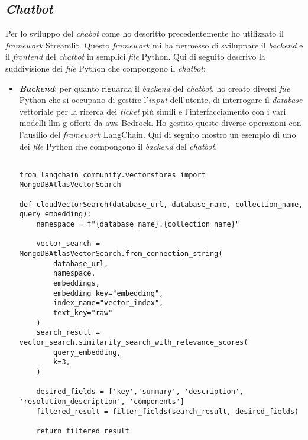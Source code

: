 \subsection{\textit{Chatbot}}
Per lo sviluppo del \textit{chabot} come ho descritto precedentemente ho utilizzato il \textit{framework} Streamlit. Questo \textit{framework} mi ha permesso di sviluppare il \textit{backend} e il \textit{frontend} del \textit{chatbot} in semplici \textit{file} Python.
Qui di seguito descrivo la suddivisione dei \textit{file} Python che compongono il \textit{chatbot}:
\begin{itemize}
    \item \textbf{\textit{Backend}}: per quanto riguarda il \textit{backend} del \textit{chatbot}, ho creato diversi \textit{file} Python che si occupano di gestire l'\textit{input} dell'utente, di interrogare il \textit{database} vettoriale per la ricerca dei \textit{ticket} più simili e l'interfacciamento con i vari modelli \gls{llm-g} offerti da \gls{aws} Bedrock. Ho gestito queste diverse operazioni con l'ausilio del \textit{framework} LangChain. Qui di seguito mostro un esempio di uno dei \textit{file} Python che compongono il \textit{backend} del \textit{chatbot}.
    \begin{verbatim}

from langchain_community.vectorstores import MongoDBAtlasVectorSearch

def cloudVectorSearch(database_url, database_name, collection_name, query_embedding):
    namespace = f"{database_name}.{collection_name}"

    vector_search = MongoDBAtlasVectorSearch.from_connection_string(
        database_url,
        namespace,
        embeddings,
        embedding_key="embedding",
        index_name="vector_index",
        text_key="raw"
    )
    search_result = vector_search.similarity_search_with_relevance_scores(
        query_embedding,
        k=3,
    )

    desired_fields = ['key','summary', 'description', 'resolution_description', 'components']
    filtered_result = filter_fields(search_result, desired_fields)

    return filtered_result
    \end{verbatim}
    \label{lst:cloudVectorSearch}



\end{itemize}
